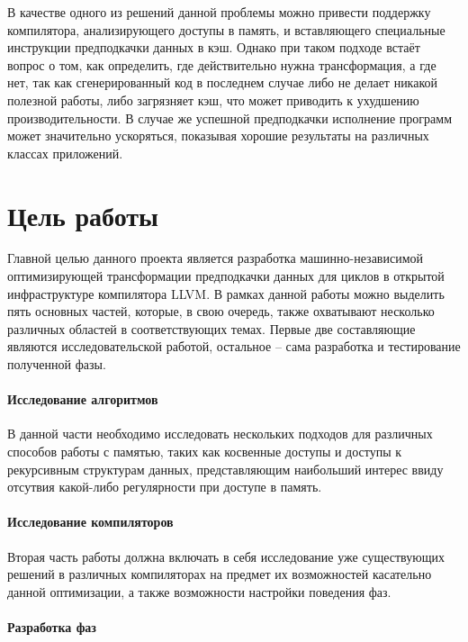 \documentclass[12pt,a4paper]{article}
\begin{document}
В качестве одного из решений данной проблемы можно привести поддержку компилятора, анализирующего доступы в память, и вставляющего специальные инструкции предподкачки данных в кэш. Однако при таком подходе встаёт вопрос о том, как определить, где действительно нужна трансформация, а где нет, так как сгенерированный код в последнем случае либо не делает никакой полезной работы, либо загрязняет кэш, что может приводить к ухудшению производительности. В случае же успешной предподкачки исполнение программ может значительно ускоряться, показывая хорошие результаты на различных классах приложений.

\newpage

\section{Цель работы}

\indent

Главной целью данного проекта является разработка машинно-независимой оптимизирующей трансформации предподкачки данных для циклов в открытой инфраструктуре компилятора LLVM. В рамках данной работы можно выделить пять основных частей, которые, в свою очередь, также охватывают несколько различных областей в соответствующих темах. Первые две составляющие являются исследовательской работой, остальное -- сама разработка и тестирование полученной фазы.

\paragraph{Исследование алгоритмов}

В данной части необходимо исследовать нескольких подходов для различных способов работы с памятью, таких как косвенные доступы и доступы к рекурсивным структурам данных, представляющим наибольший интерес ввиду отсутвия какой-либо регулярности при доступе в память.

\paragraph{Исследование компиляторов}

Вторая часть работы должна включать в себя исследование уже существующих решений в различных компиляторах на предмет их возможностей касательно данной оптимизации, а также возможности настройки поведения фаз.

\paragraph{Разработка фаз}
\end{document}
